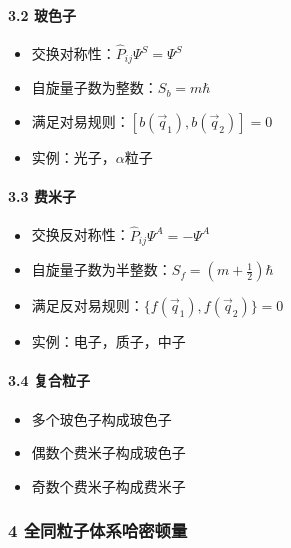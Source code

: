 \documentclass[UTF8,twocolumn]{ctexart}
\providecommand{\tightlist}{%
  \setlength{\itemsep}{0pt}\setlength{\parskip}{0pt}}
\let\oldparagraph\paragraph
\renewcommand{\paragraph}[1]{\oldparagraph{#1}\mbox{}}
\begin{document}
\hypertarget{ux73bbux8272ux5b50}{%
\paragraph{ 3.2 玻色子}\label{ux73bbux8272ux5b50}}

\begin{itemize}
\tightlist
\item
  交换对称性：\(\hat{P}_{ij}\Psi^S=\Psi^S\)
\item
  自旋量子数为整数：\(S_b=m\hbar\)
\item
  满足对易规则：\([b(\vec{q}_1),b(\vec{q}_2)]=0\)
\item
  实例：光子，\(\alpha\)粒子
\end{itemize}

\hypertarget{ux8d39ux7c73ux5b50}{%
\paragraph{ 3.3 费米子}\label{ux8d39ux7c73ux5b50}}

\begin{itemize}
\tightlist
\item
  交换反对称性：\(\hat{P}_{ij}\Psi^A=-\Psi^A\)
\item
  自旋量子数为半整数：\(S_f=(m+\frac{1}{2})\hbar\)
\item
  满足反对易规则：\(\{f(\vec{q}_1),f(\vec{q}_2)\}=0\)
\item
  实例：电子，质子，中子
\end{itemize}

\hypertarget{ux590dux5408ux7c92ux5b50}{%
\paragraph{ 3.4 复合粒子}\label{ux590dux5408ux7c92ux5b50}}

\begin{itemize}
\tightlist
\item
  多个玻色子构成玻色子
\item
  偶数个费米子构成玻色子
\item
  奇数个费米子构成费米子
\end{itemize}

\hypertarget{ux5168ux540cux7c92ux5b50ux4f53ux7cfbux54c8ux5bc6ux987fux91cf}{%
\subsubsection{4
全同粒子体系哈密顿量}\label{ux5168ux540cux7c92ux5b50ux4f53ux7cfbux54c8ux5bc6ux987fux91cf}}
\end{document}
